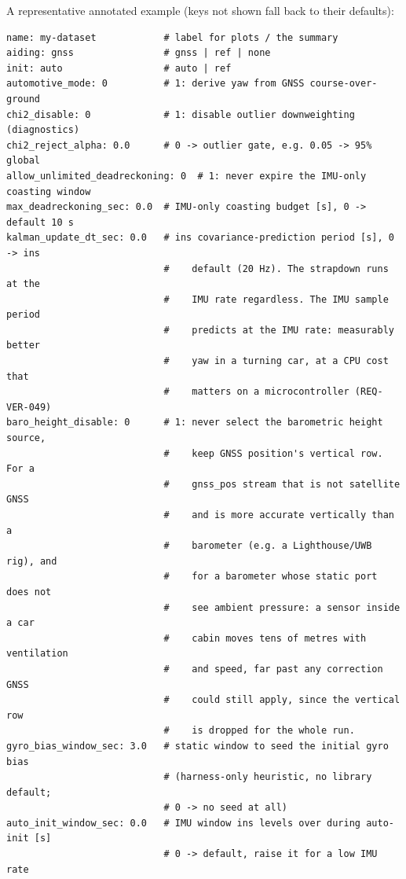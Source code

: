 \documentclass[11pt,a4paper]{article}
\begin{document}
\medskip
\noindent A representative annotated example (keys not shown fall back to their
defaults):

\begin{lstlisting}[style=cfg]
name: my-dataset            # label for plots / the summary
aiding: gnss                # gnss | ref | none
init: auto                  # auto | ref
automotive_mode: 0          # 1: derive yaw from GNSS course-over-ground
chi2_disable: 0             # 1: disable outlier downweighting (diagnostics)
chi2_reject_alpha: 0.0      # 0 -> outlier gate, e.g. 0.05 -> 95% global
allow_unlimited_deadreckoning: 0  # 1: never expire the IMU-only coasting window
max_deadreckoning_sec: 0.0  # IMU-only coasting budget [s], 0 -> default 10 s
kalman_update_dt_sec: 0.0   # ins covariance-prediction period [s], 0 -> ins
                            #    default (20 Hz). The strapdown runs at the
                            #    IMU rate regardless. The IMU sample period
                            #    predicts at the IMU rate: measurably better
                            #    yaw in a turning car, at a CPU cost that
                            #    matters on a microcontroller (REQ-VER-049)
baro_height_disable: 0      # 1: never select the barometric height source,
                            #    keep GNSS position's vertical row. For a
                            #    gnss_pos stream that is not satellite GNSS
                            #    and is more accurate vertically than a
                            #    barometer (e.g. a Lighthouse/UWB rig), and
                            #    for a barometer whose static port does not
                            #    see ambient pressure: a sensor inside a car
                            #    cabin moves tens of metres with ventilation
                            #    and speed, far past any correction GNSS
                            #    could still apply, since the vertical row
                            #    is dropped for the whole run.
gyro_bias_window_sec: 3.0   # static window to seed the initial gyro bias
                            # (harness-only heuristic, no library default;
                            # 0 -> no seed at all)
auto_init_window_sec: 0.0   # IMU window ins levels over during auto-init [s]
                            # 0 -> default, raise it for a low IMU rate


\end{lstlisting}
\end{document}
